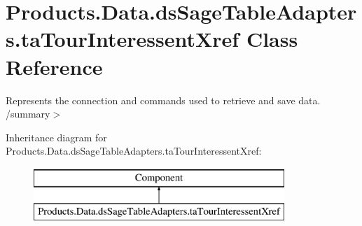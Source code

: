 \hypertarget{class_products_1_1_data_1_1ds_sage_table_adapters_1_1ta_tour_interessent_xref}{}\section{Products.\+Data.\+ds\+Sage\+Table\+Adapters.\+ta\+Tour\+Interessent\+Xref Class Reference}
\label{class_products_1_1_data_1_1ds_sage_table_adapters_1_1ta_tour_interessent_xref}


Represents the connection and commands used to retrieve and save data. /summary$>$  


Inheritance diagram for Products.\+Data.\+ds\+Sage\+Table\+Adapters.\+ta\+Tour\+Interessent\+Xref\+:\begin{figure}[H]
\begin{center}
\leavevmode
\includegraphics[height=2.000000cm]{class_products_1_1_data_1_1ds_sage_table_adapters_1_1ta_tour_interessent_xref}
\end{center}
\end{figure}
